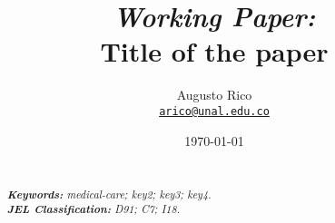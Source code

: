 \documentclass[11pt]{article}
\title{\textit{Working Paper:} \\ %
    Title of the paper %
}
\author{Augusto Rico\\
    \href{mailto:arico@unal.edu.co}{\texttt{arico@unal.edu.co}}
    }
\date{\today}
\begin{document}
{ %
\maketitle
\begin{abstract}
\noindent\lipsum[2] %
~\\
\textit{\textbf{Keywords: }%
medical-care; key2; key3; key4.} \\ %
\textit{\textbf{JEL Classification: }%
D91; C7; I18.} %
\end{abstract}}




\end{document}
